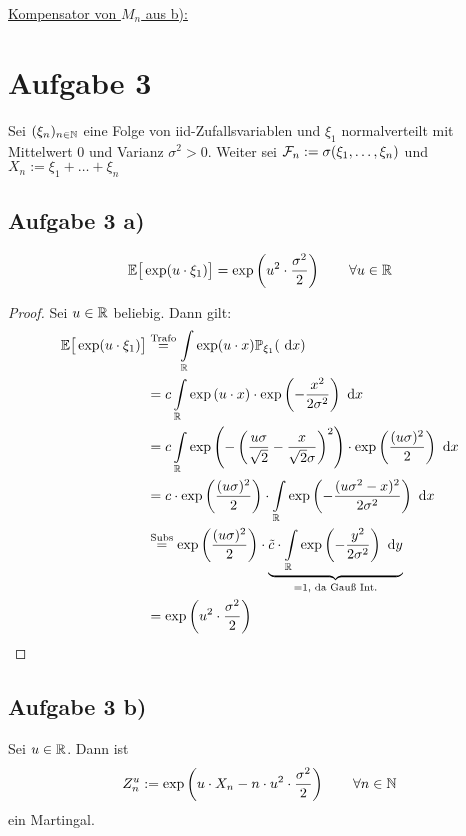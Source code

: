 \documentclass[12pt,a4paper]{article}
\begin{document}
\underline{Kompensator von $M_n$ aus b):}\\

\section*{Aufgabe 3}
Sei $(\xi_n)_{n\in\mathbb{N}}$ eine Folge von iid-Zufallsvariablen und $\xi_1$ normalverteilt mit Mittelwert 0 und Varianz $\sigma^2>0$. Weiter sei $\mathcal{F}_n:=\sigma(\xi_1,\ldots,\xi_n)$ und\\ $X_n:=\xi_1+\ldots+\xi_n$

\subsection*{Aufgabe 3 a)}
\begin{align*}
\mathbb{E}\big[\exp(u\cdot\xi_1)\big]=\exp\left(u^2\cdot\frac{\sigma^2}{2}\right)\qquad\forall u\in\mathbb{R}
\end{align*}

\begin{proof}
Sei $u\in\mathbb{R}$ beliebig. Dann gilt:
\begin{align*}
\mathbb{E}\big[\exp(u\cdot\xi_1)\big]
&\stackrel{\text{Trafo}}{=}
\int\limits_{\mathbb{R}}\exp(u\cdot x)\mathbb{P}_{\xi_1}(\text{ d} x)\\
&=c\int\limits_{\mathbb{R}} \exp\left(u\cdot x\right)\cdot \exp\left(-\frac{x^2}{2\sigma^2}\right)\text{ d} x\\
&=c\int\limits_{\mathbb{R}} \exp\left(-\left(\frac{u\sigma}{\sqrt{2}}-\frac{x}{\sqrt{2}\sigma}\right)^2\right) \cdot\exp\left(\frac{(u\sigma)^2}{2}\right)\text{ d} x\\
&=c \cdot \exp\left(\frac{(u\sigma)^2}{2}\right)\cdot\int\limits_{\mathbb{R}} \exp\left(-\frac{(u\sigma^2-x)^2}{2\sigma^2}\right)\text{ d} x\\
&\stackrel{\text{Subs}}{=}\exp\left(\frac{(u\sigma)^2}{2}\right)\cdot \underbrace{\tilde{c}\cdot\int\limits_{\mathbb{R}} \exp\left(-\frac{y^2}{2\sigma^2}\right)\text{ d} y}_{=1\text{, da Gauß Int.}}\\
&=\exp\left(u^2\cdot\frac{\sigma^2}{2}\right)
\end{align*}
\end{proof}

\subsection*{Aufgabe 3 b)}
Sei $u\in\mathbb{R}$. Dann ist
\begin{align*}
Z_n^u:=\exp\left(u\cdot X_n-n\cdot u^2\cdot\frac{\sigma^2}{2}\right)\qquad\forall n\in\mathbb{N}
\end{align*}
ein Martingal.
\end{document}
